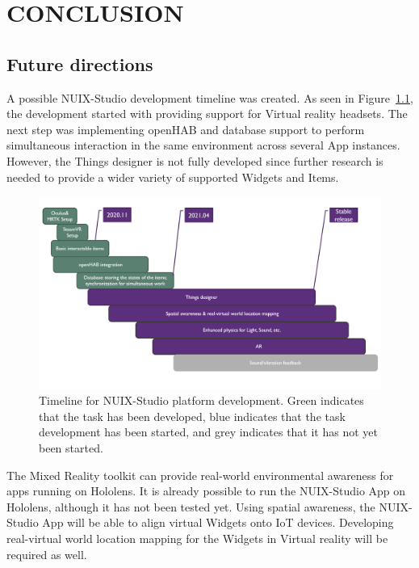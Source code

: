 
\chapter{\MakeUppercase{Conclusion}}


\section{Future directions}

A possible NUIX-Studio development timeline was created. As seen in Figure~\ref{fig:Timeline-figure}, the development started with providing support for Virtual reality headsets. The next step was implementing openHAB and database support to perform simultaneous interaction in the same environment across several App instances. However, the Things designer is not fully developed since further research is needed to provide a wider variety of supported Widgets and Items.

\begin{figure}
  \centering
  \includegraphics[width=0.9\linewidth]{figures/Timeline.png}
  \caption{Timeline for NUIX-Studio platform development. Green indicates that the task has been developed, blue indicates that the task development has been started, and grey indicates that it has not yet been started.}
  \label{fig:Timeline-figure}
\end{figure}

The Mixed Reality toolkit can provide real-world environmental awareness for apps running on Hololens. It is already possible to run the NUIX-Studio App on Hololens, although it has not been tested yet. Using spatial awareness, the NUIX-Studio App will be able to align virtual Widgets onto IoT devices. Developing real-virtual world location mapping for the Widgets in Virtual reality will be required as well.

